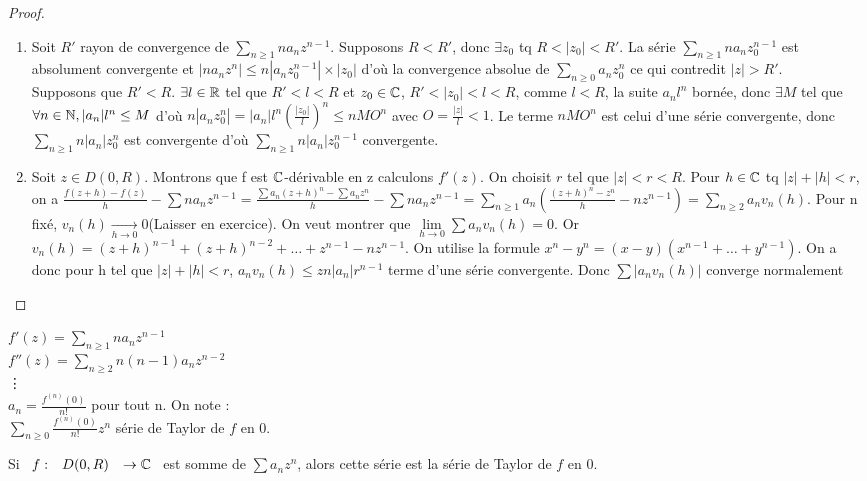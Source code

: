 \documentclass[]{report}
\begin{document}
\begin{proof}
    \begin{enumerate}
        \item Soit $R'$ rayon de convergence de $\sum_{n\ge1}na_nz^{n-1}$. Supposons $R<R'$, donc $\exists z_0$ tq $R<|z_0|<R'$. La série $\sum_{n\ge1}na_nz_0^{n-1}$ est absolument convergente et $|na_nz^{n}|\le n|a_nz_0^{n-1}|\times |z_0|$ d'où la convergence absolue de $\sum_{n\ge0}a_nz_0^{n}$ ce qui contredit $|z|>R'$.\\
        Supposons que $R'<R$. $\exists l\in\mathbb{R} $ tel que $R'<l<R$ et $z_0\in\mathbb{C}$, $R'<|z_0|<l<R$, comme $l<R$, la suite $a_nl^n$ bornée, donc $\exists M$ tel que $\forall n \in \mathbb{N},|a_n|l^n \le M$ d'où $n|a_nz_0^n|=|a_n|l^n(\frac{|z_0|}{l})^n\le nMO^n$ avec $O=\frac{|z|}{l}<1$. Le terme $nMO^n$ est celui d'une série convergente, donc $\sum_{n\ge1}n|a_n|z_0^{n}$ est convergente d'où $\sum_{n\ge1}n|a_n|z_0^{n-1}$ convergente.
        \item Soit $z\in D(0,R)$. Montrons que f est $\mathbb{C}$-dérivable en z calculons $f'(z)$. On choisit $r$ tel que $|z|<r<R$. Pour $h\in\mathbb{C}$ tq $|z|+|h|<r$, on a $\frac{f(z+h)-f(z)}{h}-\sum na_nz^{n-1}=\frac{\sum a_n (z+h)^n-\sum a_nz^n}{h}-\sum na_nz^{n-1}=\sum_{n\ge1}a_n(\frac{(z+h)^n-z^n}{h}-nz^{n-1})=\sum_{n\ge2}a_nv_n(h)$. Pour n fixé, $v_n(h) \underset{h\to 0}{\longrightarrow} 0 $(Laisser en exercice). On veut montrer que $\lim\limits_{h \rightarrow 0} \sum a_nv_n(h)=0$. Or $v_n(h)=(z+h)^{n-1}+(z+h)^{n-2}+\ldots+z^{n-1}-nz^{n-1}$. On utilise la formule $x^n-y^n=(x-y)(x^{n-1}+\ldots+y^{n-1})$. On a donc pour h tel que $|z|+|h|<r$, $a_nv_n(h)\le zn|a_n|r^{n-1}$ terme d'une série convergente. Donc $\sum|a_nv_n(h)|$ converge normalement
    \end{enumerate}
\end{proof}

\begin{re}
    $f'(z)=\sum_{n\ge1}na_nz^{n-1}$\\
    $f''(z)=\sum_{n\ge2}n(n-1)a_nz^{n-2}$\\
    \vdots \\
    $a_n=\frac{f^{(n)}(0)}{n!}$ pour tout n. On note :\\
    $\sum_{n\ge0}\frac{f^{(n)}(0)}{n!}z^n$ série de Taylor de $f$ en 0.
\end{re}

\begin{cor}
    Si $\begin{array}{ccccc} f : & D(0,R) & \to  \mathbb{C}\end{array}$ est somme de $\sum a_n z^n$, alors cette série est la série de Taylor de $f$ en 0.
\end{cor}
\end{document}
